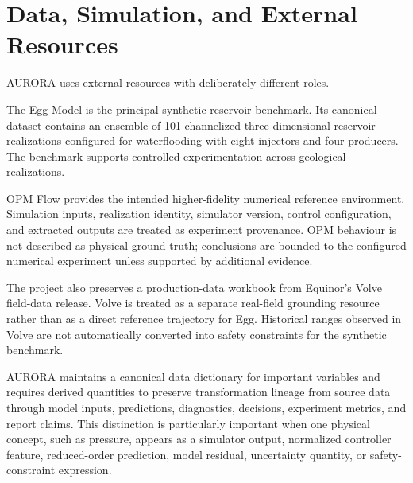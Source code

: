 \section{Data, Simulation, and External Resources}
\label{sec:data}

AURORA uses external resources with deliberately different roles.

The Egg Model is the principal synthetic reservoir benchmark. Its canonical dataset
contains an ensemble of 101 channelized three-dimensional reservoir realizations
configured for waterflooding with eight injectors and four producers. The benchmark
supports controlled experimentation across geological realizations.

OPM Flow provides the intended higher-fidelity numerical reference environment.
Simulation inputs, realization identity, simulator version, control configuration,
and extracted outputs are treated as experiment provenance. OPM behaviour is not
described as physical ground truth; conclusions are bounded to the configured
numerical experiment unless supported by additional evidence.

The project also preserves a production-data workbook from Equinor's Volve field-data
release. Volve is treated as a separate real-field grounding resource rather than as
a direct reference trajectory for Egg. Historical ranges observed in Volve are not
automatically converted into safety constraints for the synthetic benchmark.

AURORA maintains a canonical data dictionary for important variables and requires
derived quantities to preserve transformation lineage from source data through model
inputs, predictions, diagnostics, decisions, experiment metrics, and report claims.
This distinction is particularly important when one physical concept, such as
pressure, appears as a simulator output, normalized controller feature,
reduced-order prediction, model residual, uncertainty quantity, or safety-constraint
expression.

